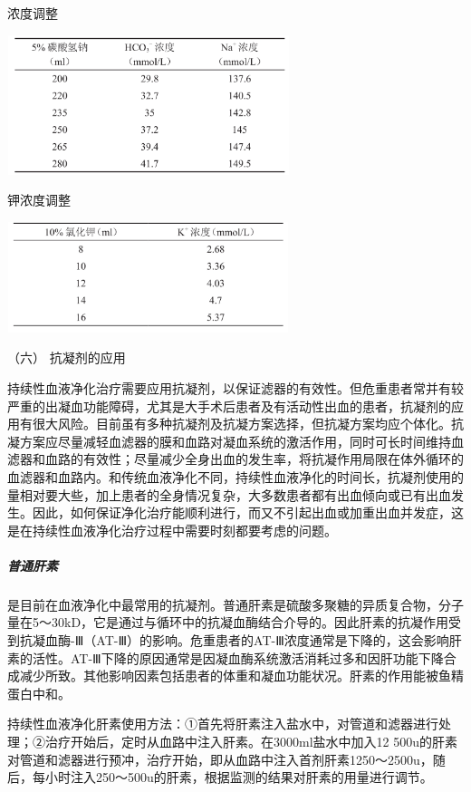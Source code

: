 \begin{table}[htbp]
\centering
\caption{{} 浓度调整}
\label{tab143-3}
\includegraphics[width=3.25in,height=1.60417in]{./images/Image00531.jpg}
\end{table}

\begin{table}[htbp]
\centering
\caption{钾浓度调整}
\label{tab143-4}
\includegraphics[width=3.23958in,height=1.27083in]{./images/Image00532.jpg}
\end{table}

\hypertarget{text00391.htmlux5cux23CHP16-10-2-3-6}{}
（六） 抗凝剂的应用

持续性血液净化治疗需要应用抗凝剂，以保证滤器的有效性。但危重患者常并有较严重的出凝血功能障碍，尤其是大手术后患者及有活动性出血的患者，抗凝剂的应用有很大风险。目前虽有多种抗凝剂及抗凝方案选择，但抗凝方案均应个体化。抗凝方案应尽量减轻血滤器的膜和血路对凝血系统的激活作用，同时可长时间维持血滤器和血路的有效性；尽量减少全身出血的发生率，将抗凝作用局限在体外循环的血滤器和血路内。和传统血液净化不同，持续性血液净化的时间长，抗凝剂使用的量相对要大些，加上患者的全身情况复杂，大多数患者都有出血倾向或已有出血发生。因此，如何保证净化治疗能顺利进行，而又不引起出血或加重出血并发症，这是在持续性血液净化治疗过程中需要时刻都要考虑的问题。

\subparagraph{普通肝素}

是目前在血液净化中最常用的抗凝剂。普通肝素是硫酸多聚糖的异质复合物，分子量在5～30kD，它是通过与循环中的抗凝血酶结合介导的。因此肝素的抗凝作用受到抗凝血酶-Ⅲ（AT-Ⅲ）的影响。危重患者的AT-Ⅲ浓度通常是下降的，这会影响肝素的活性。AT-Ⅲ下降的原因通常是因凝血酶系统激活消耗过多和因肝功能下降合成减少所致。其他影响因素包括患者的体重和凝血功能状况。肝素的作用能被鱼精蛋白中和。

持续性血液净化肝素使用方法：①首先将肝素注入盐水中，对管道和滤器进行处理；②治疗开始后，定时从血路中注入肝素。在3000ml盐水中加入12
500u的肝素对管道和滤器进行预冲，治疗开始，即从血路中注入首剂肝素1250～2500u，随后，每小时注入250～500u的肝素，根据监测的结果对肝素的用量进行调节。

